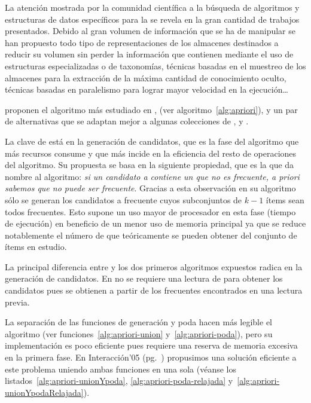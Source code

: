 
La atención mostrada por la comunidad científica a la búsqueda de algoritmos y estructuras de datos específicos para la \fim se revela en la gran cantidad de trabajos presentados. Debido al gran volumen de información que se ha de manipular se han propuesto todo tipo de representaciones de los almacenes \D destinados a reducir su volumen sin perder la información que contienen mediante el uso de estructuras especializadas o de taxonomías, técnicas basadas en el muestreo de los almacenes \D para la extracción de la máxima cantidad de conocimiento oculto, técnicas basadas en paralelismo para lograr mayor velocidad en la ejecución\ldots

\citet{AgrawalSrikant-FastAlgorithmsForMiningAssociationRules-1994} proponen el algoritmo más estudiado en \ARM, \apriori (ver algoritmo~\ref{alg:apriori}), y un par de alternativas que se adaptan mejor a algunas colecciones de \transacciones,  y .

La clave de \apriori está en la generación de candidatos, que es la fase del algoritmo que más recursos consume y que más incide en la eficiencia del resto de operaciones del algoritmo. Su propuesta se basa en la siguiente propiedad, que es la que da nombre al algoritmo: \emph{si un candidato a \kitemset contiene un \kitemset[k-1] que no es frecuente, \textsl{a priori} sabemos que no puede ser frecuente}. Gracias a esta observación en su algoritmo sólo se generan los candidatos a \kitemset frecuente cuyos subconjuntos de $k-1$ ítems sean todos frecuentes. Esto supone un uso mayor de procesador en esta fase (tiempo de ejecución) en beneficio de un menor uso de memoria principal ya que se reduce notablemente el número de \itemsets que teóricamente se pueden obtener del conjunto \I de ítems en estudio.

La principal diferencia entre \apriori y los dos primeros algoritmos expuestos radica en la generación de candidatos. En \apriori no se requiere una lectura de \D para obtener los candidatos pues se obtienen a partir de los \itemsets frecuentes encontrados en una lectura previa.

La separación de las funciones de generación y poda hacen más legible el algoritmo (ver funciones~\ref{alg:apriori-union} y~\ref{alg:apriori-poda}), pero su implementación es poco eficiente pues requiere una reserva de memoria excesiva en la primera fase. En Interacción'05 (pg.~\pageref{sec:nuestro-Mejora-2005}) propusimos una solución eficiente a este problema uniendo ambas funciones en una sola (véanse los listados~\ref{alg:apriori-unionYpoda}, \ref{alg:apriori-poda-relajada} y~\ref{alg:apriori-unionYpodaRelajada}).

